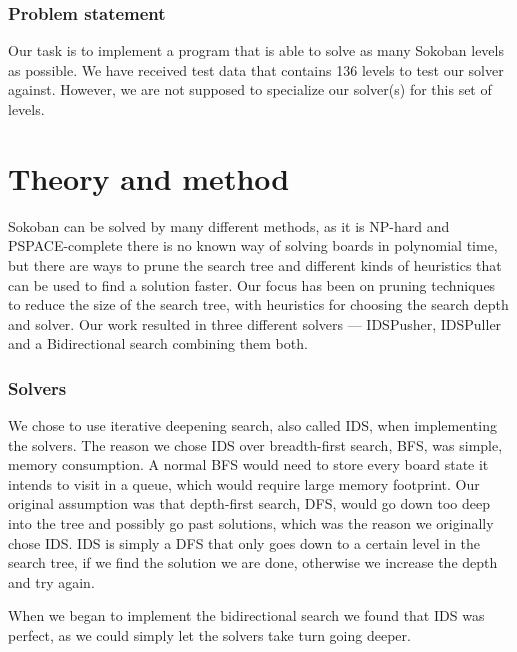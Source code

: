 \documentclass[a4paper,12pt]{article}
\renewcommand{\*}[0]{\cdot}
\begin{document}
\section{Problem statement}


Our task is to implement a program that is able to solve as many Sokoban levels
as possible. We have received test data that contains 136 levels to test our
solver against. However, we are not supposed to specialize our solver(s) for
this set of levels.


\part*{Theory and method}


Sokoban can be solved by many different methods, as it is NP-hard and
PSPACE-complete there is no known way of solving boards in polynomial time,
but there are ways to prune the search tree and different kinds of heuristics
that can be used to find a solution faster. Our focus has been on pruning
techniques to reduce the size of the search tree, with heuristics for choosing
the search depth and solver. Our work resulted in three different solvers ---
IDSPusher, IDSPuller and a Bidirectional search combining them both.


\section{Solvers}

We chose to use iterative deepening search, also called IDS, when
implementing the solvers. The reason we chose IDS over breadth-first search,
BFS, was simple, memory consumption. A normal BFS would need to store every
board state it intends to visit in a queue, which would require large memory
footprint. Our original assumption was that depth-first search, DFS, would go
down too deep into the tree and possibly go past solutions, which was the
reason we originally chose IDS. IDS is simply a DFS that only goes down to a
certain level in the search tree, if we find the solution we are done, otherwise we
increase the depth and try again.

When we began to implement the bidirectional search we found that IDS was
perfect, as we could simply let the solvers take turn going deeper.
\end{document}
